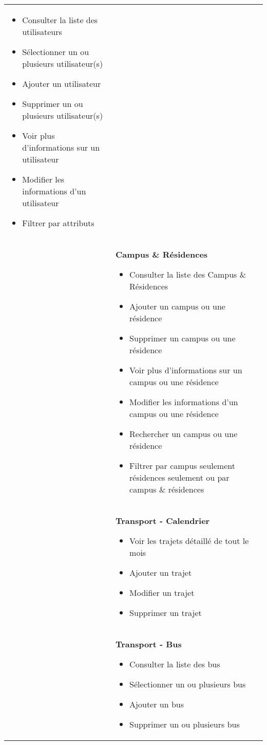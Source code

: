 \begin{longtable}{|Z{3cm}|L{10cm}|}
    \begin{itemize}
        \item Consulter la liste des utilisateurs
        \item Sélectionner un ou plusieurs utilisateur(s)
        \item Ajouter un utilisateur
        \item Supprimer un ou plusieurs utilisateur(s)
        \item Voir plus d'informations sur un utilisateur
        \item Modifier les informations d'un utilisateur
        \item Filtrer par attributs
    \end{itemize}\\
    &
    \textbf{Campus \& Résidences}
    \begin{itemize}
        \item Consulter la liste des Campus \& Résidences
        \item Ajouter un campus ou une résidence
        \item Supprimer un campus ou une résidence
        \item Voir plus d'informations sur un campus ou une résidence
        \item Modifier les informations d'un campus ou une résidence
        \item Rechercher un campus ou une résidence
        \item Filtrer par campus seulement résidences seulement ou par campus \& résidences
    \end{itemize}\\
    &
    \textbf{Transport - Calendrier}
    \begin{itemize}
        \item Voir les trajets détaillé de tout le mois
        \item Ajouter un trajet
        \item Modifier un trajet
        \item Supprimer un trajet
    \end{itemize}\\
    &
    \textbf{Transport - Bus}
    \begin{itemize}
        \item Consulter la liste des bus
        \item Sélectionner un ou plusieurs bus
        \item Ajouter un bus
        \item Supprimer un ou plusieurs bus

\end{itemize}
\end{longtable}
